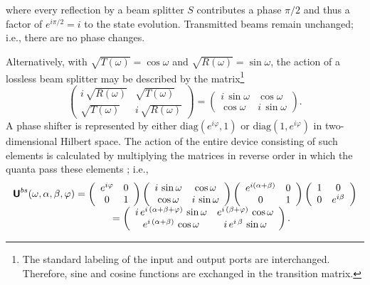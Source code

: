 \documentclass{llncs}
\begin{document}
where every reflection by a beam splitter $S$ contributes a phase $\pi /2$
and thus a factor of $e^{i\pi /2}=i$ to the state evolution.
Transmitted beams remain unchanged; i.e., there are no phase changes.


Alternatively, with
$\sqrt{T(\omega )}=\cos \omega$
and
$\sqrt{R(\omega )}=\sin \omega$,
the action of a lossless beam splitter may be
described by the matrix\footnote{
The standard labeling of the input and output ports are interchanged.
Therefore, sine and cosine functions are exchanged in the transition matrix.}
$$
\left(
\begin{array}{cc}
i \, \sqrt{R(\omega )}& \sqrt{T(\omega )}
\\
\sqrt{T(\omega )}&  i\, \sqrt{R(\omega )}
 \end{array}
\right)
=
\left(
\begin{array}{cc}
i \, \sin \omega  & \cos \omega
\\
\cos \omega&  i\, \sin \omega
 \end{array}
\right)
.
$$
A phase shifter is represented by
either
$\mbox{diag}\left(
e^{i\varphi },1
\right)
$
or
$\mbox{diag}
\left(
1,e^{i\varphi }
\right)
$ in two-dimensional Hilbert space.
 The action of the entire device consisting of such elements is
calculated by multiplying the matrices in reverse order in which the
quanta pass these elements \cite{yurke-86,teich:90}; i.e.,
\begin{equation}
\begin{array}{l}
{\textsf{\textbf{U}}}^{bs} (\omega ,\alpha ,\beta ,\varphi )=
\left(
\begin{array}{cc}
e^{i\varphi}& 0\\
0& 1
\end{array}
\right)
\left(
\begin{array}{cc}
i \, \sin \omega  & \cos \omega
\\
\cos \omega&  i\, \sin \omega
\end{array}
\right)
\left(
\begin{array}{cc}
e^{i(\alpha + \beta)}& 0\\
0& 1
\end{array}
\right)
\left(
\begin{array}{cc}
1&0\\
0& e^{i\beta }
\end{array}
\right)
\\
\qquad
\qquad
\qquad
\qquad
\qquad
=
\left(
\begin{array}{cc}
 i \,e^{i \,\left( \alpha + \beta + \varphi \right) }\,\sin \omega &
   e^{i \,\left( \beta + \varphi \right) }\,\cos \omega
\cr
   e^{i \,\left( \alpha + \beta \right) }\, \cos \omega&
i \,e^{i \,\beta}\,\sin \omega
 \end{array}
\right)
.
\end{array}
\end{equation}
\end{document}
